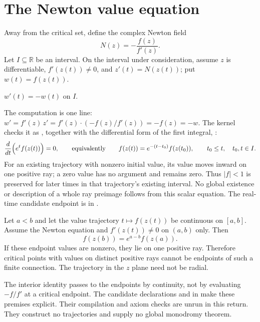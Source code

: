 \section{The Newton value equation}\label{sec:newton}

Away from the critical set, define the complex Newton field
\[
  N(z)=-\frac{f(z)}{f'(z)} .
\]
Let $I\subseteq\mathbb R$ be an interval. On the interval under consideration,
assume $z$ is differentiable, $f'(z(t))\ne0$, and $z'(t)=N(z(t))$;
put $w(t)=f(z(t))$.

\begin{theorem}\label{res:value}
$w'(t)=-w(t)$ on $I$.
\end{theorem}

\noindent The computation is one line: $w'=f'(z)\,z'=f'(z)\cdot(-f(z)/f'(z))=-f(z)=-w$.
The kernel checks it as , together with the
differential form of the first integral,
:
\[
  \frac{d}{dt}\Bigl(e^{t}f(z(t))\Bigr)=0,
  \qquad\text{equivalently}\qquad
  f(z(t))=e^{-(t-t_0)}f(z(t_0)),\qquad t_0\le t,\quad t_0,t\in I .
\]
For an existing trajectory with nonzero initial value, its value moves
inward on one positive ray; a zero value has no argument and remains zero.
Thus $|f|<1$ is preserved for later times in that trajectory's existing
interval. No global existence or description of a whole ray preimage follows
from this scalar equation. The real-time candidate endpoint is
 in .

\begin{corollary}\label{res:ray}
Let $a<b$ and let the value trajectory $t\mapsto f(z(t))$ be continuous on
$[a,b]$. Assume the Newton equation and $f'(z(t))\ne0$ on $(a,b)$ only.
Then
\[
 f(z(b))=e^{a-b}f(z(a)).
\]
If these endpoint values are nonzero, they lie on one positive ray. Therefore
critical points with values on distinct positive rays cannot be endpoints
of such a finite connection. The trajectory in the $z$ plane need not be radial.
\end{corollary}

\noindent The interior identity passes to the endpoints by continuity, not
by evaluating $-f/f'$ at a critical endpoint. The candidate declarations
 and
in  make these
premises explicit. Their compilation and axiom checks are unrun in this
return. They construct no trajectories and supply no global monodromy theorem.

